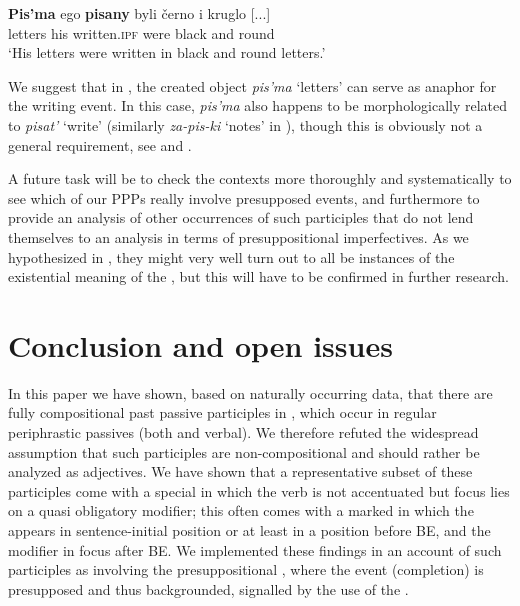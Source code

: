 \documentclass[output=paper,modfonts,newtxmath,hidelinks
\ChapterDOI{10.5281/zenodo.2545513}
]{langscibook}
\begin{document}
\ea\gll	\textbf{Pis'ma} ego \textbf{pisany} byli černo i kruglo [...]\\
	letters his written.\textsc{ipf} were black and round \\
\glt	`His letters were written in black and round letters.'\label{kruglo}
\z

\noindent We suggest that in , the created object \textit{pis'ma} `letters' can serve as anaphor for the writing event. In this case, \textit{pis'ma} also happens to be morphologically related to \textit{pisat'} `write' (similarly \textit{za-pis-ki} `notes' in ), though this is obviously not a general requirement, see   and .

A future task will be to check the contexts more thoroughly and systematically to see which of our  PPPs really involve presupposed events, and furthermore to provide an analysis of other occurrences of such participles that do not lend themselves to an analysis in terms of presuppositional imperfectives. As we hypothesized in , they might very well turn out to all be instances of the existential meaning of the , but this will have to be confirmed in further research.

\section{Conclusion and open issues}
\label{concl}

In this paper we have shown, based on naturally occurring data, that there are fully compositional  past passive participles in , which occur in regular periphrastic passives (both  and verbal). We therefore refuted the widespread assumption that such participles are non-compositional and should rather be analyzed as adjectives. We have shown that a representative subset of these participles come with a special  in which the verb is not accentuated but focus lies on a quasi obligatory modifier; this often comes with a marked  in which the  appears in sentence-initial position or at least in a position before BE, and the modifier in focus after BE. We implemented these findings in an account of such participles as involving the presuppositional , where the event (completion) is presupposed and thus backgrounded, signalled by the use of the .
\end{document}
